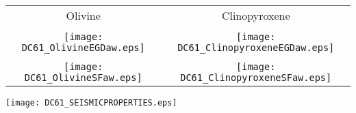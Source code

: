 \documentclass{article}
\begin{document}
\begin{tabular}{c c} 
  \LARGE{Olivine} & \LARGE{Clinopyroxene} \tabularnewline 
 \tabularnewline 
 \texttt{[image: DC61\_OlivineEGDaw.eps]} & \texttt{[image:  DC61\_ClinopyroxeneEGDaw.eps]} \tabularnewline 
 \tabularnewline 
 \texttt{[image: DC61\_OlivineSFaw.eps]} & \texttt{[image:  DC61\_ClinopyroxeneSFaw.eps]} \tabularnewline 
 \end{tabular} 
 \begin{center} 
 \texttt{[image: DC61\_SEISMICPROPERTIES.eps]}
 \end{center} 
 
 
\end{document}
